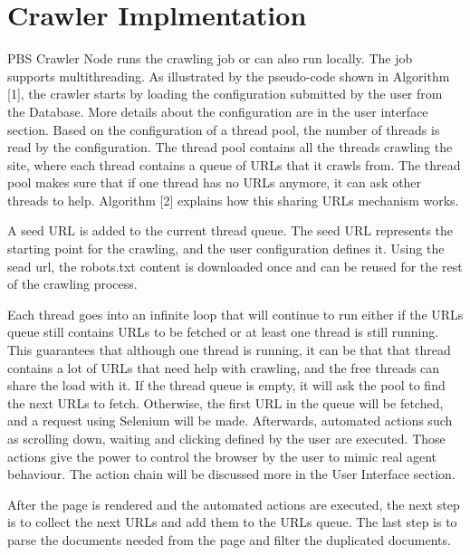 \section{Crawler Implmentation}

PBS Crawler Node runs the crawling job or can also run locally. The job supports multithreading. As illustrated by the pseudo-code shown in Algorithm [1], the crawler starts by loading the configuration submitted by the user from the Database. More details about the configuration are in the user interface section. Based on the configuration of a thread pool, the number of threads is read by the configuration. The thread pool contains all the threads crawling the site, where each thread contains a queue of URLs that it crawls from. The thread pool makes sure that if one thread has no URLs anymore, it can ask other threads to help. Algorithm [2] explains how this sharing URLs mechanism works. 

A seed URL is added to the current thread queue. The seed URL represents the starting point for the crawling, and the user configuration defines it. Using the sead url, the robots.txt content is downloaded once and can be reused for the rest of the crawling process.    

Each thread goes into an infinite loop that will continue to run either if the URLs queue still contains URLs to be fetched or at least one thread is still running. This guarantees that although one thread is running, it can be that that thread contains a lot of URLs that need help with crawling, and the free threads can share the load with it. If the thread queue is empty, it will ask the pool to find the next URLs to fetch. Otherwise, the first URL in the queue will be fetched, and a request using Selenium will be made. Afterwards, automated actions such as scrolling down, waiting and clicking defined by the user are executed. Those actions give the power to control the browser by the user to mimic real agent behaviour. The action chain will be discussed more in the User Interface section.  

After the page is rendered and the automated actions are executed, the next step is to collect the next URLs and add them to the URLs queue. The last step is to parse the documents needed from the page and filter the duplicated documents. 


